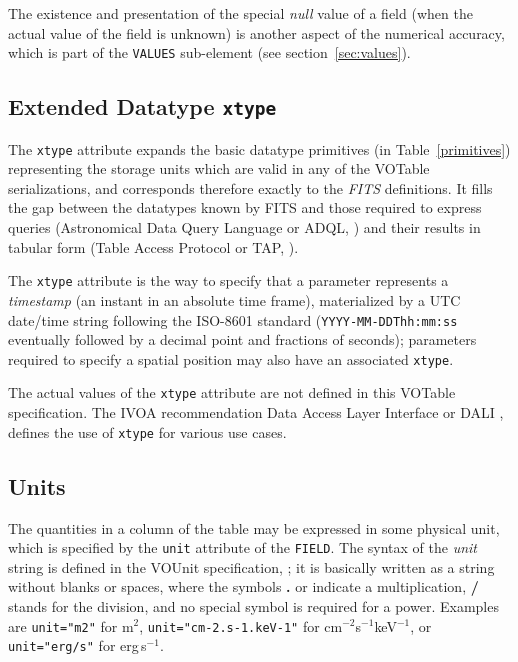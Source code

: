 \documentclass[11pt,a4paper]{ivoa}
\def\Aref#1{section~\ref{#1}}
\def\Tref#1{Table~\ref{#1}}
\let\fg=\color
\def\attr#1{{\tt{\fg{DarkRed}#1}}}
\def\elem#1{{\tt{\fg{DarkRed}#1}}}
\def\attrval#1#2{{\tt{\fg{DarkRed}#1}="{\fg{DarkPurple}#2}"}}
\begin{document}
The existence and presentation of the special {\em null} value of
a field (when the actual value of the field is unknown) is
another aspect of the numerical accuracy, which is part of the
\elem{VALUES} sub-element (see \Aref{sec:values}).

\subsection{Extended Datatype \attr{xtype}}
\label{sec:xtype}

The \attr{xtype} attribute expands the basic
datatype primitives (in \Tref{primitives})
representing the storage units which are valid in any of the
VOTable serializations,
and corresponds therefore exactly to the {\em FITS} definitions.
It fills the gap between the datatypes
known by FITS and those required to express queries
(Astronomical Data Query Language or ADQL, \citet{2008ivoa.spec.1030O})
and their results in tabular form (Table Access Protocol or TAP,
\citet{2010ivoa.spec.0327D}).

The \attr{xtype} attribute is the way to
specify that a parameter represents a {\em  timestamp}
(an instant in an absolute time frame), materialized by a
UTC date/time string following the ISO-8601 standard
({\tt YYYY-MM-DDThh:mm:ss} eventually followed by a decimal point
and fractions of seconds);
parameters required to specify a spatial position may also have an associated
\attr{xtype}.

The actual values of the \attr{xtype} attribute are not defined
in this VOTable specification.
The IVOA recommendation Data Access Layer Interface
or DALI \citep{2017ivoa.spec.0517D},
defines the use of \attr{xtype} for various use cases.

\subsection{Units}
\label{sec:unit}

The quantities in a column of the table may be expressed in
some physical unit,
which is specified by the {\attr{unit}}
attribute of the {\elem{FIELD}}.
The  syntax of the {\em unit} string is defined in
the VOUnit specification, \citet{2014ivoa.spec.0523D};
it is basically written as a string without blanks or spaces,
where the symbols {\bf.} or {\bf*} indicate a multiplication,
{\bf/} stands for the division, and no special symbol is required
for a power.
Examples are \attrval{unit}{m2} for m$^2$,
\attrval{unit}{cm-2.s-1.keV-1} for cm$^{-2}$s$^{-1}$keV$^{-1}$,
or \attrval{unit}{erg/s} for erg\,s$^{-1}$.
\end{document}
